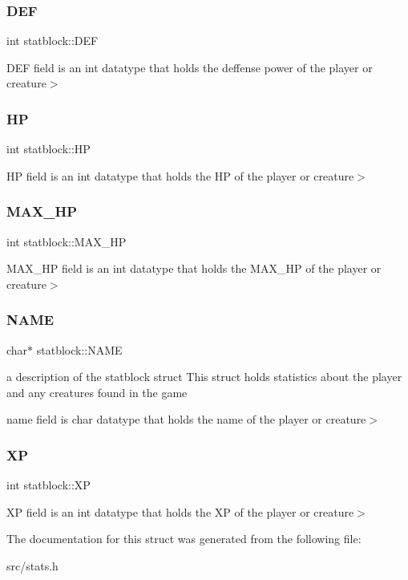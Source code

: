 \subsubsection{\texorpdfstring{D\+EF}{DEF}}
{\footnotesize\ttfamily int statblock\+::\+D\+EF}

D\+EF field is an int datatype that holds the deffense power of the player or creature$>$ \mbox{\label{structstatblock_acdf7920a3342cdce3de6e994c59a4f49}} 
\subsubsection{\texorpdfstring{HP}{HP}}
{\footnotesize\ttfamily int statblock\+::\+HP}

HP field is an int datatype that holds the HP of the player or creature$>$ \mbox{\label{structstatblock_aabeab2123a62dd566ce98a2cfd3a2558}} 
\subsubsection{\texorpdfstring{M\+A\+X\+\_\+\+HP}{MAX\_HP}}
{\footnotesize\ttfamily int statblock\+::\+M\+A\+X\+\_\+\+HP}

M\+A\+X\+\_\+\+HP field is an int datatype that holds the M\+A\+X\+\_\+\+HP of the player or creature$>$ \mbox{\label{structstatblock_a0b3f85d2530cb092d03989a5322ffdbb}} 
\subsubsection{\texorpdfstring{N\+A\+ME}{NAME}}
{\footnotesize\ttfamily char$\ast$ statblock\+::\+N\+A\+ME}



a description of the statblock struct This struct holds statistics about the player and any creatures found in the game 

name field is char datatype that holds the name of the player or creature$>$ \mbox{\label{structstatblock_afd2fdd4e4d203624439447abd612a046}} 
\subsubsection{\texorpdfstring{XP}{XP}}
{\footnotesize\ttfamily int statblock\+::\+XP}

XP field is an int datatype that holds the XP of the player or creature$>$ 

The documentation for this struct was generated from the following file\+:\begin{DoxyCompactItemize}
\item 
src/stats.\+h\end{DoxyCompactItemize}
